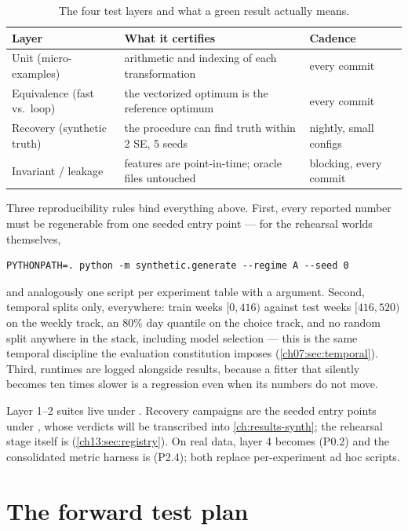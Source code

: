 \begin{table}[htbp]
\centering
\small
\begin{tabular}{lp{5.6cm}l}
\toprule
Layer & What it certifies & Cadence \\
\midrule
Unit (micro-examples) & arithmetic and indexing of each transformation & every commit \\
Equivalence (fast vs.\ loop) & the vectorized optimum is the reference optimum & every commit \\
Recovery (synthetic truth) & the procedure can find truth within 2 SE, 5 seeds & nightly, small configs \\
Invariant / leakage & features are point-in-time; oracle files untouched & blocking, every commit \\
\bottomrule
\end{tabular}
\caption{The four test layers and what a green result actually means.}
\label{chcp:tab:layers}
\end{table}

Three reproducibility rules bind everything above. First, every reported number must be regenerable from one
seeded entry point --- for the rehearsal worlds themselves,
\begin{verbatim}
PYTHONPATH=. python -m synthetic.generate --regime A --seed 0
\end{verbatim}
and analogously one script per experiment table with a  argument. Second, temporal splits only,
everywhere: train weeks $[0,416)$ against test weeks $[416,520)$ on the weekly track, an 80\% day quantile on
the choice track, and no random split anywhere in the stack, including model selection --- this is the same
temporal discipline the evaluation constitution imposes (\cref{ch07:sec:temporal}). Third, runtimes are logged
alongside results, because a fitter that silently becomes ten times slower is a regression even when its
numbers do not move.

\begin{codehooks}
Layer 1--2 suites live under . Recovery campaigns are the seeded entry points under
, whose verdicts will be transcribed into \cref{ch:results-synth}; the rehearsal stage
itself is  (\cref{ch13:sec:registry}). On real data, layer 4 becomes 
(P0.2) and the consolidated metric harness is  (P2.4); both replace per-experiment ad hoc
scripts.
\end{codehooks}

\section{The forward test plan}
\label{chcp:sec:forward}

